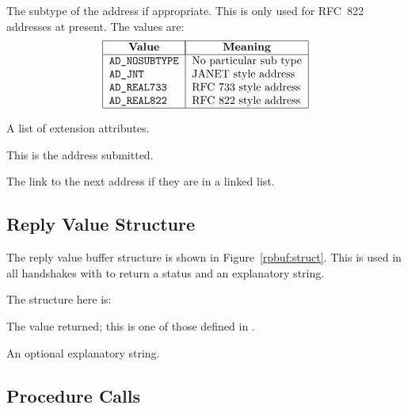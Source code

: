 \begin{describe}
\item[\verb|ad\_subtype|:]	The subtype of the address if
appropriate. This is only used for RFC~822 addresses at present. The
values are:
\[\begin{tabular}{|l|l|}
\hline
	\multicolumn{1}{|c|}{\bf Value}&
		\multicolumn{1}{|c|}{\bf Meaning}\\
\hline
	\tt AD\_NOSUBTYPE&	No particular sub type\\
	\tt AD\_JNT&		JANET style address\\
	\tt AD\_REAL733&	RFC~733 style address\\
	\tt AD\_REAL822&	RFC~822 style address\\
\hline
\end{tabular}\]	

\item[\verb|ad\_pre\_recip\_ext\_list|:]	A list of extension
attributes. 

\item[\verb|ad\_value|:]	This is the address submitted.

\item[\verb|ad\_next|:]	The link to the next address if they are in a
linked list.
\end{describe}

\subsection{Reply Value Structure}

The reply value buffer structure is shown in
Figure~\ref{rpbuf:struct}. This is used in all handshakes with 
to return a status and an explanatory string.


The structure here is:

\begin{describe}
\item[\verb|rp\_val|:]	The value returned; this is one of those
defined in .

\item[\verb|rp\_line|:]	An optional explanatory string.
\end{describe}

\subsection {Procedure Calls}

